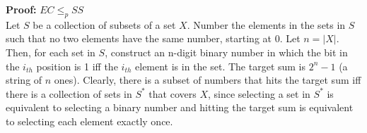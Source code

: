 \documentclass[12pt]{article}
\begin{document}
\textbf{Proof:} $EC \le_p SS$\\

Let $S$ be a collection of subsets of a set $X$. Number the elements in the sets in $S$ such that no two elements have the same number, starting at 0. Let $n = |X|$. Then, for each set in $S$, construct an n-digit binary number in which the bit in the $i_{th}$ position is 1 iff the $i_{th}$ element is in the set. The target sum is $2^{n} - 1$ (a string of $n$ ones). Clearly, there is a subset of numbers that hits the target sum iff there is a collection of sets in $S^*$ that covers $X$, since selecting a set in $S^*$ is equivalent to selecting a binary number and hitting the target sum is equivalent to selecting each element exactly once.
\end{document}
